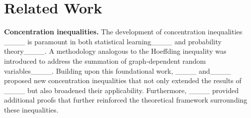 \section{Related Work}
\textbf{Concentration inequalities.}
The development of concentration inequalities ____ is paramount in both statistical learning____ and probability theory____. A methodology analogous to the Hoeffding inequality was introduced to address the summation of graph-dependent random variables____. Building upon this foundational work, ____ and____ proposed new concentration inequalities that not only extended the results of ____ but also broadened their applicability. Furthermore, ____ provided additional proofs that further reinforced the theoretical framework surrounding these inequalities.

